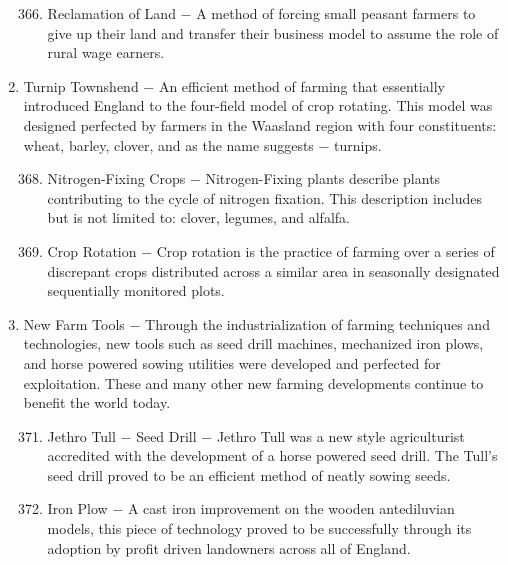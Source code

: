 \documentclass[12pt]{article}
\begin{document}
\begin{enumerate}
\begin{enumerate}[label=\arabic{*}.]
\setcounter{enumii}{365}

\item Reclamation of Land $-$ A method of forcing small peasant farmers to give up their land and transfer their business model to assume the role of rural wage earners.

\end{enumerate}
\setcounter{enumi}{366}

\item Turnip Townshend $-$ An efficient method of farming that essentially introduced England to the four-field model of crop rotating. This model was designed perfected by farmers in the Waasland region with four constituents: wheat, barley, clover, and as the name suggests $-$ turnips.

\begin{enumerate}[label=\arabic{*}.]
\setcounter{enumii}{367}

\item Nitrogen-Fixing Crops $-$ Nitrogen-Fixing plants describe plants contributing to the cycle of nitrogen fixation. This description includes but is not limited to: clover, legumes, and alfalfa.

\item Crop Rotation $-$ Crop rotation is the practice of farming over a series of discrepant crops distributed across a similar area in seasonally designated sequentially monitored plots.

\end{enumerate}
\setcounter{enumi}{369}

\item New Farm Tools $-$ Through the industrialization of farming techniques and technologies, new tools such as seed drill machines, mechanized iron plows, and horse powered sowing utilities were developed and perfected for exploitation. These and many other new farming developments continue to benefit the world today.

\begin{enumerate}[label=\arabic{*}.]
\setcounter{enumii}{370}

\item Jethro Tull $-$ Seed Drill $-$ Jethro Tull was a new style agriculturist accredited with the development of a horse powered seed drill. The Tull's seed drill proved to be an efficient method of neatly sowing seeds.

\item Iron Plow $-$ A cast iron improvement on the wooden antediluvian models, this piece of technology proved to be successfully through its adoption by profit driven landowners across all of England.


\end{enumerate}
\end{enumerate}
\end{document}
